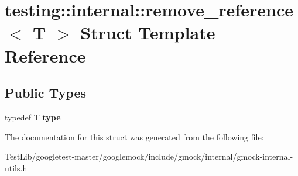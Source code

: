 \hypertarget{structtesting_1_1internal_1_1remove__reference}{}\section{testing\+:\+:internal\+:\+:remove\+\_\+reference$<$ T $>$ Struct Template Reference}
\label{structtesting_1_1internal_1_1remove__reference}
\subsection*{Public Types}
\begin{DoxyCompactItemize}
\item 
\mbox{\label{structtesting_1_1internal_1_1remove__reference_a291edca52c59a0d211977d4802439b8a}} 
typedef T {\bfseries type}
\end{DoxyCompactItemize}


The documentation for this struct was generated from the following file\+:\begin{DoxyCompactItemize}
\item 
Test\+Lib/googletest-\/master/googlemock/include/gmock/internal/gmock-\/internal-\/utils.\+h\end{DoxyCompactItemize}
